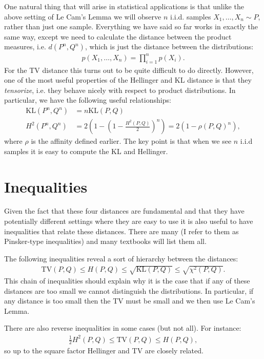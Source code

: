 \documentclass[twoside,12pt]{article}
\begin{document}
One natural thing that will arise in statistical applications is that unlike the above setting of Le Cam's Lemma we will observe $n$ i.i.d. samples $X_1,\ldots,X_n \sim P$, rather than just one sample. Everything we have said so far works in exactly the same way, except we need to calculate the distance between the product measures, i.e. $d(P^n, Q^n)$, which is just the distance between the distributions:
\begin{align*}
p(X_1,\ldots,X_n) = \prod_{i=1}^n p(X_i).
\end{align*}
For the TV distance this turns out to be quite difficult to do directly. However, one of the most useful properties of the Hellinger and KL distance is that they \emph{tensorize}, i.e. they behave nicely with respect to product distributions. In particular, we have the following useful relationships:
\begin{align*}
\text{KL}(P^n, Q^n) &= n \text{KL}(P,Q) \\
H^2(P^n,Q^n) &= 2\left( 1 - \left(1 - \frac{H^2(P,Q)}{2} \right)^n \right) = 2\left( 1 - \rho(P,Q)^n \right),
\end{align*}
where $\rho$ is the affinity defined earlier. The key point is that when we see $n$ i.i.d samples it is easy to compute the KL and Hellinger. 

\section{Inequalities}
Given the fact that these four distances are fundamental and that they have potentially different settings where they are easy to use it is also useful to have inequalities that relate these distances. There are many (I refer to them as Pinsker-type inequalities) and many textbooks will list them all.

The following inequalities reveal a sort of hierarchy between the distances:
\begin{align*}
\text{TV}(P,Q) \leq H(P,Q) \leq \sqrt{\text{KL}(P,Q)} \leq \sqrt{\chi^2(P,Q)}.
\end{align*}
This chain of inequalities should explain why it is the case that if any of these distances are too small we cannot distinguish the distributions. In particular, if any distance is too small then the TV must be small and we then use Le Cam's Lemma.

There are also reverse inequalities in some cases (but not all). For instance:
\begin{align*}
\frac{1}{2} H^2(P,Q) \leq \text{TV}(P,Q) \leq H(P,Q),
\end{align*}
so up to the square factor Hellinger and TV are closely related.
\end{document}
